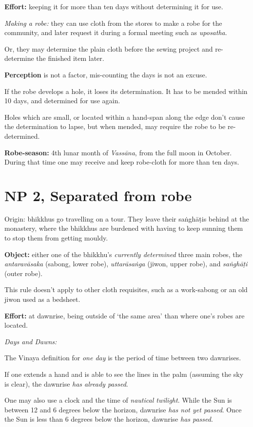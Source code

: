 \textbf{Effort:} keeping it for more than ten days without determining
it for use.

\emph{Making a robe:} they can use cloth from the stores to make a robe
for the community, and later request it during a formal meeting such as
\emph{uposatha}.

Or, they may determine the plain cloth before the sewing project and
re-determine the finished item later.

\textbf{Perception} is not a factor, mis-counting the days is not an
excuse.

If the robe develops a hole, it loses its determination. It has to be
mended within 10 days, and determined for use again.

Holes which are small, or located within a hand-span along the edge
don't cause the determination to lapse, but when mended, may require the
robe to be re-determined.

\textbf{Robe-season:} 4th lunar month of \emph{Vassāna}, from the full
moon in October. During that time one may receive and keep robe-cloth
for more than ten days.

\section{NP 2, Separated from robe}

Origin: bhikkhus go travelling on a tour. They leave their saṅghāṭis
behind at the monastery, where the bhikkhus are burdened with having to
keep sunning them to stop them from getting mouldy.

\textbf{Object:} either one of the bhikkhu's \emph{currently determined}
three main robes, the \emph{antaravāsaka} (sabong, lower robe),
\emph{uttarāsaṅga} (jiwon, upper robe), and \emph{saṅghāṭi} (outer
robe).

This rule doesn't apply to other cloth requisites, such as a work-sabong
or an old jiwon used as a bedsheet.

\textbf{Effort:} at dawnrise, being outside of `the same area' than
where one's robes are located.

\emph{Days and Dawns:}

The Vinaya definition for \emph{one day} is the period of time between
two dawnrises.

If one extends a hand and is able to see the lines in the palm (assuming
the sky is clear), the dawnrise \emph{has already passed}.

One may also use a clock and the time of \emph{nautical twilight}. While
the Sun is between 12 and 6 degrees below the horizon, dawnrise
\emph{has not yet passed}. Once the Sun is less than 6 degrees below the
horizon, dawnrise \emph{has passed}.

